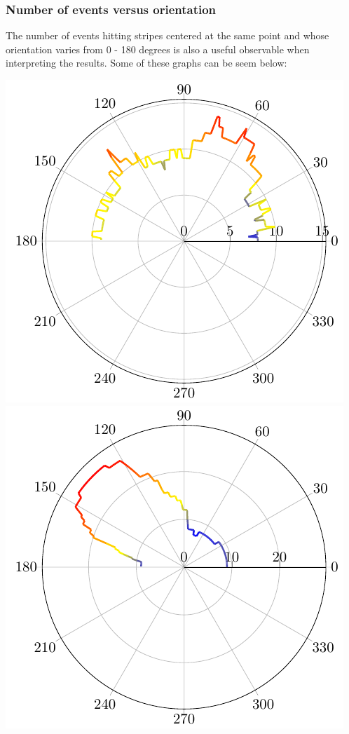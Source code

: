\documentclass[12pt]{article}
\begin{document}
\subsubsection{Number of events versus orientation}

The number of events hitting stripes centered at the same point and
whose orientation varies from 0 - 180 degrees is also a useful observable
when interpreting the results. Some of these graphs can be seem below:

\includegraphics[scale=0.8]{multiplicity.pdf}  
\includegraphics[scale=0.8]{multiplicity-sim.pdf} 
\end{document}
